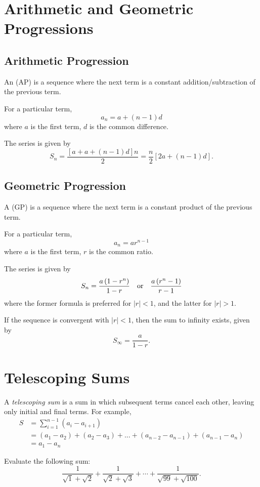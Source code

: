 \section{Arithmetic and Geometric Progressions}
\subsection{Arithmetic Progression}
An  (AP) is a sequence where the next term is a constant addition/subtraction of the previous term.

For a particular term,
\[ a_n=a+(n-1)d \]
where $a$ is the first term, $d$ is the common difference.

The series is given by
\[ S_n=\frac{[a+a+(n-1)d]n}{2}=\frac{n}{2}[2a+(n-1)d]. \]

\subsection{Geometric Progression}
A  (GP) is a sequence where the next term is a constant product of the previous term.

For a particular term,
\[ a_n=ar^{n-1} \]
where $a$ is the first term, $r$ is the common ratio.

The series is given by
\[ S_n=\frac{a\left(1-r^n\right)}{1-r} \quad \text{or} \quad \frac{a\left(r^n-1\right)}{r-1} \]
where the former formula is preferred for $|r|<1$, and the latter for $|r|>1$.

If the sequence is convergent with $|r|<1$, then the sum to infinity exists, given by
\[ S_\infty=\frac{a}{1-r}. \]

\section{Telescoping Sums}
A \emph{telescoping sum} is a sum in which subsequent terms cancel each other, leaving only initial and final terms. For example,
\begin{align*}
S &= \sum_{i=1}^{n-1} (a_i-a_{i+1})	
\\&= (a_1-a_2)+(a_2-a_3)+...+(a_{n-2}-a_{n-1})+(a_{n-1}-a_n)	
\\&= a_1-a_n	
\end{align*}

\begin{exercise}
Evaluate the following sum: 
\[ \frac{1}{\sqrt{1}+\sqrt{2}}+\frac{1}{\sqrt{2}+\sqrt{3}}+\cdots+\frac{1}{\sqrt{99}+\sqrt{100}}. \] 
\end{exercise}


